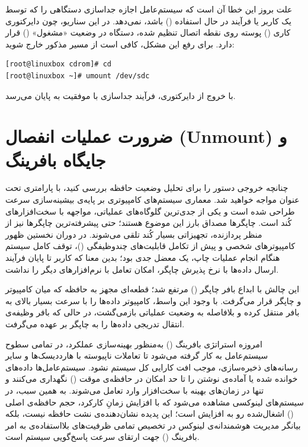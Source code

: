 علت بروز این خطا آن است که سیستم‌عامل اجازه جداسازی دستگاهی را که توسط یک کاربر یا فرآیند در حال استفاده () باشد، نمی‌دهد. در این سناریو، چون دایرکتوری کاری () پوسته روی نقطه اتصال تنظیم شده، دستگاه در وضعیت «مشغول» () قرار دارد. برای رفع این مشکل، کافی است از مسیر مذکور خارج شوید:

\begin{latin}
\begin{lstlisting}
[root@linuxbox cdrom]# cd
[root@linuxbox ~]# umount /dev/sdc
\end{lstlisting}
\end{latin}

با خروج از دایرکتوری، فرآیند جداسازی با موفقیت به پایان می‌رسد.

\section{ضرورت عملیات انفصال (Unmount) و جایگاه بافرینگ}

چنانچه خروجی دستور  را برای تحلیل وضعیت حافظه بررسی کنید، با پارامتری تحت عنوان  مواجه خواهید شد. معماری سیستم‌های کامپیوتری بر پایه‌ی بیشینه‌سازی سرعت طراحی شده است و یکی از جدی‌ترین گلوگاه‌های عملیاتی، مواجهه با سخت‌افزارهای کُند است. چاپگرها مصداق بارز این موضوع هستند؛ حتی پیشرفته‌ترین چاپگرها نیز از منظر پردازنده، تجهیزاتی بسیار کُند تلقی می‌شوند. در دوران نخستین ظهور کامپیوترهای شخصی و پیش از تکامل قابلیت‌های چندوظیفگی ()، توقف کامل سیستم هنگام انجام عملیات چاپ، یک معضل جدی بود؛ بدین معنا که کاربر تا پایان فرآیند ارسال داده‌ها با نرخ پذیرش چاپگر، امکان تعامل با نرم‌افزارهای دیگر را نداشت.

این چالش با ابداع بافر چاپگر () مرتفع شد؛ قطعه‌ای مجهز به حافظه  که میان کامپیوتر و چاپگر قرار می‌گرفت. با وجود این واسط، کامپیوتر داده‌ها را با سرعت بسیار بالای  به بافر منتقل کرده و بلافاصله به وضعیت عملیاتی بازمی‌گشت، در حالی که بافر وظیفه‌ی انتقال تدریجی داده‌ها را به چاپگر بر عهده می‌گرفت.

امروزه استراتژی بافرینگ () به‌منظور بهینه‌سازی عملکرد، در تمامی سطوح سیستم‌عامل به کار گرفته می‌شود تا تعاملات ناپیوسته با هارددیسک‌ها و سایر رسانه‌های ذخیره‌سازی، موجب افت کارایی کل سیستم نشود. سیستم‌عامل‌ها داده‌های خوانده شده یا آماده‌ی نوشتن را تا حد امکان در حافظه‌ی موقت () نگهداری می‌کنند و تنها در زمان‌های بهینه با سخت‌افزار وارد تعامل می‌شوند. به همین سبب، در سیستم‌های لینوکسی مشاهده می‌شود که با افزایش زمانِ کارکرد، حجم حافظه‌ی اصلی () اشغال‌شده رو به افزایش است؛ این پدیده نشان‌دهنده‌ی نشت حافظه نیست، بلکه بیانگر مدیریت هوشمندانه‌ی لینوکس در تخصیص تمامی ظرفیت‌های بلااستفاده‌ی  به امر بافرینگ () جهت ارتقای سرعت پاسخ‌گویی سیستم است.

